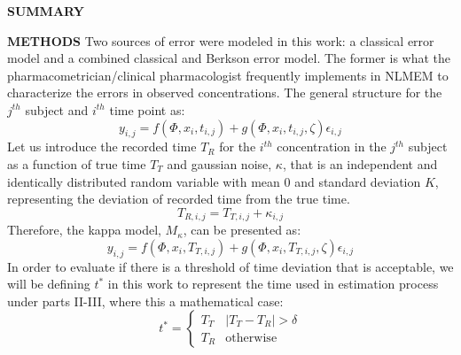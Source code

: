 \documentclass[final]{beamer}
\newlength{\colwidth}
\begin{document}
\begin{frame}[t]
\begin{columns}[t]
\begin{column}{\colwidth}
\begin{alertblock}{\textbf{SUMMARY}}
  \end{alertblock}
  \begin{block}{\textbf{METHODS}}
Two sources of error were modeled in this work: a classical error model and a combined classical and Berkson error model. The former is what the pharmacometrician/clinical pharmacologist frequently implements in NLMEM to characterize the errors in observed concentrations. The general structure for the $j^{th}$ subject and $i^{th}$ time point as:
\begin{equation}\label{eq:1}
y_{i,j} = f(\Phi, x_i, t_{i,j}) + g(\Phi, x_i, t_{i,j}, \zeta)\epsilon_{i,j}
\end{equation}  
Let us introduce the recorded time $T_R$ for the $i^{th}$ concentration in the $j^{th}$ subject as a function of true time   $T_T$ and gaussian noise, $\kappa$, that is an independent and identically distributed random variable with mean 0 and standard deviation $K$, representing the deviation of recorded time from the true time.
\begin{equation}\label{eq:two}
	T_{R,i,j} = T_{T,i,j} + \kappa_{i,j} 
\end{equation}
Therefore, the kappa model, $M_\kappa$, can be presented as:
\begin{equation}\label{eq:three}
y_{i,j} = f(\Phi, x_i, T_{T,i,j}) + g(\Phi, x_i, T_{T,i,j}, \zeta)\epsilon_{i,j}
\end{equation}  
In order to evaluate if there is a threshold of time deviation that is acceptable, we will be defining $t^*$ in this work to represent the time used in estimation process under parts II-III, where this a mathematical case:
\begin{equation}\label{eq:for}
t^* = \begin{cases} T_T & |T_T - T_R| > \delta \\ T_R & \mathrm{otherwise} \end{cases}
\end{equation} 


\end{block}
\end{column}
\end{columns}
\end{frame}
\end{document}
